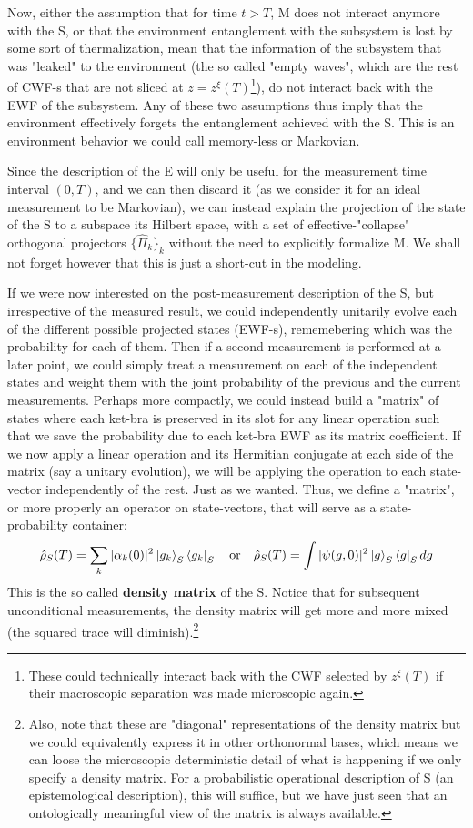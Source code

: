 \documentclass[11pt, a4paper]{article} %
\begin{document}
Now, either the assumption that for time $t>T$, M does not interact anymore with the S, or that the environment entanglement with the subsystem is lost by some sort of thermalization, mean that the information of the subsystem that was "leaked" to the environment (the so called "empty waves", which are the rest of CWF-s that are not sliced at $z=z^\xi(T)$\footnote{These could technically interact back with the CWF selected by $z^\xi(T)$ if their macroscopic separation was made microscopic again.}), do not interact back with the EWF of the subsystem. Any of these two assumptions thus imply that the environment effectively forgets the entanglement achieved with the S. This is an environment behavior we could call memory-less or Markovian.

Since the description of the E will only be useful for the measurement time interval $(0,T)$, and we can then discard it (as we consider it for an ideal measurement to be Markovian), we can instead explain the projection of the state of the S to a subspace its Hilbert space, with a set of effective-"collapse" orthogonal projectors $\{\hat{\Pi}_k\}_k$ without the need to explicitly formalize M. We shall not forget however that this is just a short-cut in the modeling.

If we were now interested on the post-measurement description of the S, but irrespective of the measured result, we could independently unitarily evolve each of the different possible projected states (EWF-s), rememebering which was the probability for each of them. Then if a second measurement is performed at a later point, we could simply treat a measurement on each of the independent states and weight them with the joint probability of the previous and the current measurements. Perhaps more compactly, we could instead build a "matrix" of states where each ket-bra is preserved in its slot for any linear operation such that we save the probability due to each ket-bra EWF as its matrix coefficient. If we now apply a linear operation and its Hermitian conjugate at each side of the matrix (say a unitary evolution), we will be applying the operation to each state-vector independently of the rest. Just as we wanted. Thus, we define a "matrix", or more properly an operator on state-vectors, that will serve as a state-probability container:
\begin{equation}\label{dens}
\hat{\rho}_S(T) =\sum_k |\alpha_k(0)|^2\ket{g_k}_S\bra{g_k}_S \quad \text{or} \quad \hat{\rho}_S(T)=\int |\psi(g,0)|^2\ket{g}_S\bra{g}_S dg
\end{equation}
This is the so called {\bf density matrix} of the S. Notice that for subsequent unconditional measurements, the density matrix will get more and more mixed (the squared trace will diminish).\footnote{Also, note that these are "diagonal" representations of the density matrix but we could equivalently express it in other orthonormal bases, which means we can loose the microscopic deterministic detail of what is happening if we only specify a density matrix. For a probabilistic operational description of S (an epistemological description), this will suffice, but we have just seen that an ontologically meaningful view of the matrix is always available.}
\end{document}
